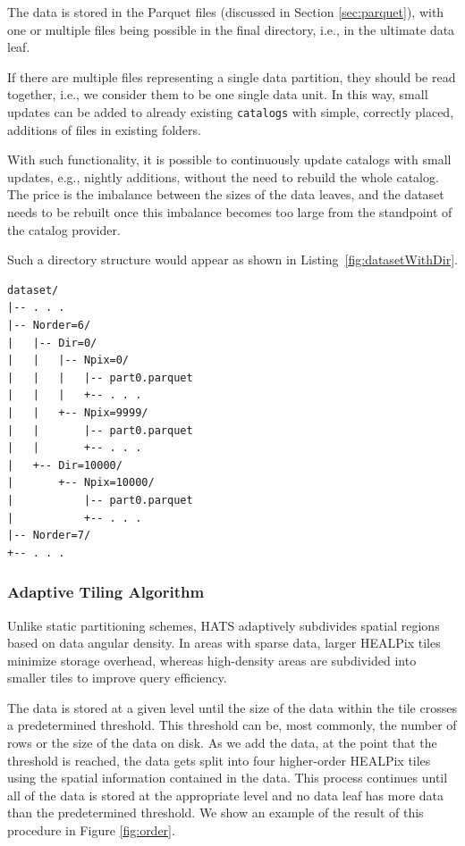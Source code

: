 \documentclass[11pt,a4paper]{ivoa}
\begin{document}
The data is stored in the Parquet files (discussed in Section \ref{sec:parquet}), with one or multiple files being possible in the final directory, i.e., in the ultimate data leaf.  \par 
If there are multiple files representing a single data partition, they should be read together, i.e., we consider them to be one single data unit. In this way, small updates can be added to already existing  \texttt{catalogs} with simple, correctly placed, additions of files in existing folders. \par 
With such functionality, it is possible to continuously update catalogs with small updates, e.g., nightly additions, without the need to rebuild the whole catalog. The price is the imbalance between the sizes of the data leaves, and the dataset needs to be rebuilt once this imbalance becomes too large from the standpoint of the catalog provider.


Such a directory structure would appear as shown in Listing~\ref{fig:datasetWithDir}.

\begin{minipage}{\linewidth}
\begin{lstlisting}[caption=Example catalog dataset directory contents with leaf directories, label=fig:datasetWithDir]
dataset/
|-- . . .
|-- Norder=6/
|   |-- Dir=0/
|   |   |-- Npix=0/
|   |   |   |-- part0.parquet
|   |   |   +-- . . .
|   |   +-- Npix=9999/
|   |       |-- part0.parquet
|   |       +-- . . .
|   +-- Dir=10000/
|       +-- Npix=10000/
|           |-- part0.parquet
|           +-- . . .
|-- Norder=7/
+-- . . .
\end{lstlisting} 
\end{minipage} 

\subsubsection{Adaptive Tiling Algorithm} \label{sec:adaptive}
Unlike static partitioning schemes, HATS adaptively subdivides spatial regions based on data angular density. 
In areas with sparse data, larger HEALPix tiles minimize storage overhead, whereas high-density areas are subdivided into smaller tiles to improve query efficiency. \par

The data is stored at a given level until the size of the data within the tile crosses a predetermined threshold. 
This threshold can be, most commonly, the number of rows or the size of the data on disk. 
As we add the data, at the point that the threshold is reached, the data gets split into four higher-order HEALPix tiles using the spatial information contained in the data. 
This process continues until all of the data is stored at the appropriate level and no data leaf has more data than the predetermined threshold. We show an example of the result of this procedure in Figure \ref{fig:order}.
\end{document}

